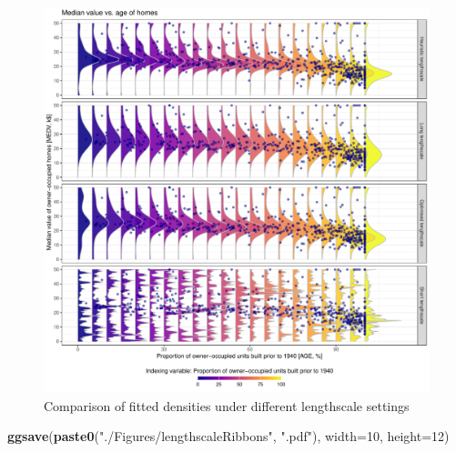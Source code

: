 \documentclass[
]{article}
\newenvironment{Shaded}{\begin{snugshade}}{\end{snugshade}}
\newcommand{\AttributeTok}[1]{\textcolor[rgb]{0.13,0.29,0.53}{#1}}
\newcommand{\DecValTok}[1]{\textcolor[rgb]{0.00,0.00,0.81}{#1}}
\newcommand{\FunctionTok}[1]{\textcolor[rgb]{0.13,0.29,0.53}{\textbf{#1}}}
\newcommand{\NormalTok}[1]{#1}
\newcommand{\StringTok}[1]{\textcolor[rgb]{0.31,0.60,0.02}{#1}}
\begin{document}
\begin{figure}[H]

{\centering \includegraphics{IntroductionSLGP_files/figure-latex/plotRibbonsLen1-1} 

}

\caption{Comparison of fitted densities under different lengthscale settings}\label{fig:plotRibbonsLen1}
\end{figure}

\begin{Shaded}
\begin{Highlighting}[]
\FunctionTok{ggsave}\NormalTok{(}\FunctionTok{paste0}\NormalTok{(}\StringTok{"./Figures/lengthscaleRibbons"}\NormalTok{,  }\StringTok{".pdf"}\NormalTok{), }
       \AttributeTok{width=}\DecValTok{10}\NormalTok{, }\AttributeTok{height=}\DecValTok{12}\NormalTok{)}
\end{Highlighting}
\end{Shaded}
\end{document}
